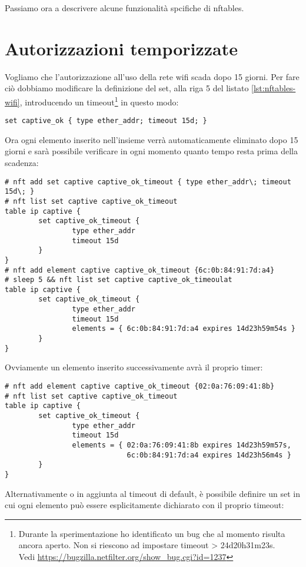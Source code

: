 Passiamo ora a descrivere alcune funzionalità spcifiche di nftables.

\section{Autorizzazioni temporizzate}

Vogliamo che
l'autorizzazione all'uso della rete wifi scada dopo 15 giorni.  Per fare ciò
dobbiamo modificare la definizione del set, alla riga 5 del listato
\ref{lst:nftables-wifi}, introducendo un timeout\footnote{Durante la
    sperimentazione ho identificato un bug che al
    momento risulta ancora aperto. Non si riescono ad impostare timeout >
24d20h31m23s.\\Vedi \url{https://bugzilla.netfilter.org/show\_bug.cgi?id=1237}
} in questo modo:
\begin{lstlisting}[style=customc, firstnumber=5]
set captive_ok { type ether_addr; timeout 15d; }
\end{lstlisting}
Ora ogni elemento inserito nell'insieme verrà automaticamente eliminato dopo 15
giorni e sarà possibile verificare in ogni momento quanto tempo resta prima
della scadenza:
\begin{lstlisting}[style=customc]
# nft add set captive captive_ok_timeout { type ether_addr\; timeout 15d\; }
# nft list set captive captive_ok_timeout
table ip captive {
        set captive_ok_timeout {
                type ether_addr
                timeout 15d
        }
}
# nft add element captive captive_ok_timeout {6c:0b:84:91:7d:a4}
# sleep 5 && nft list set captive captive_ok_timeoulat
table ip captive {
        set captive_ok_timeout {
                type ether_addr
                timeout 15d
                elements = { 6c:0b:84:91:7d:a4 expires 14d23h59m54s }
        }
}
\end{lstlisting}
Ovviamente un elemento inserito successivamente avrà il proprio timer:
\begin{lstlisting}[style=customc]
# nft add element captive captive_ok_timeout {02:0a:76:09:41:8b}
# nft list set captive captive_ok_timeout
table ip captive {
        set captive_ok_timeout {
                type ether_addr
                timeout 15d
                elements = { 02:0a:76:09:41:8b expires 14d23h59m57s,
                             6c:0b:84:91:7d:a4 expires 14d23h56m4s }
        }
}
\end{lstlisting}
\newpage
Alternativamente o in aggiunta al timeout di default, è possibile definire un
set in cui ogni elemento può essere esplicitamente dichiarato con il proprio
timeout:

